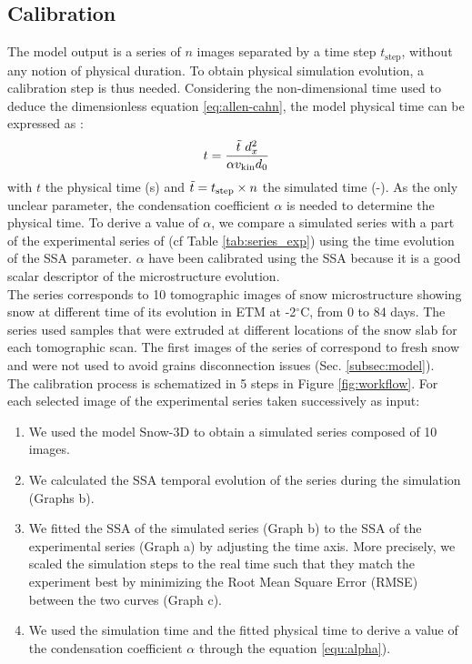\documentclass[draft,ms]{agujournal2019}
\begin{document}
\subsection{Calibration} 
\label{subsec:calib}
 The model output is a series of $n$ images separated by a time step $t_{\mathrm{step}}$, without any notion of physical duration. To obtain physical simulation evolution, a calibration step is thus needed.
Considering the non-dimensional time used to deduce the dimensionless equation \eqref{eq:allen-cahn}, the model physical time can be expressed as \cite{bretin_and_denis_discrete-continuous_2015}: 
\begin{equation}\label{equ:alpha}
   t = \frac{\Tilde{t}\ d_x^2}{\alpha v_{\mathrm{kin}} d_0}
\end{equation}
with $t$ the physical time (s) and $\Tilde{t} = t_{\mathrm{step}} \times n$ the simulated time (-). As the only unclear parameter, the condensation coefficient $\alpha$ is needed to determine the physical time. To derive a value of $\alpha$, we compare a simulated series with a part of the experimental series of  (cf Table \ref{tab:series_exp}) using the time evolution of the SSA parameter. $\alpha$ have been calibrated using the SSA because it is a good scalar descriptor of the microstructure evolution.\\
The series corresponds to 10 tomographic images of snow microstructure showing snow at different time of its evolution in ETM at -2$^\circ$C, from 0 to 84 days. The series used samples that were extruded at different locations of the snow slab for each tomographic scan. The first images of the series of  correspond to fresh snow and were not used to avoid grains disconnection issues (Sec. \ref{subsec:model}).\\
The calibration process is schematized in 5 steps in Figure \ref{fig:workflow}. For each selected image of the experimental series taken successively as input: \\
\begin{enumerate}
    \item We used the model Snow-3D to obtain a simulated series composed of 10 images. 
    \item We calculated the SSA temporal evolution of the series during the simulation (Graphs b).
    \item We fitted the SSA of the simulated series (Graph b) to the SSA of the experimental series (Graph a) by adjusting the time axis. More precisely, we scaled the simulation steps to the real time such that they match the experiment best by minimizing the Root Mean Square Error (RMSE) between the two curves (Graph c).   
    \item We used the simulation time and the fitted physical time to derive a value of the condensation coefficient $\alpha$ through the equation \eqref{equ:alpha}). 
\end{enumerate}
\end{document}

